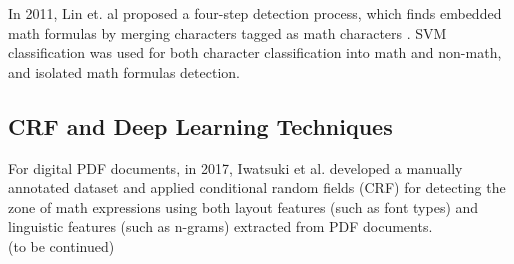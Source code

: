 In 2011, Lin et. al proposed a four-step detection process, which finds embedded math formulas by merging characters tagged as math characters \cite{Lin2011}. SVM classification was used for both character classification into math and non-math, and isolated math formulas detection.

\subsection{CRF and Deep Learning Techniques}
For digital PDF documents, in 2017, Iwatsuki et al. \cite{Iwatsuki2017} developed a manually annotated dataset and applied conditional random fields (CRF) for detecting the zone of math expressions using both layout features (such as font types) and linguistic features (such as n-grams) extracted from PDF documents.\\
(to be continued)

